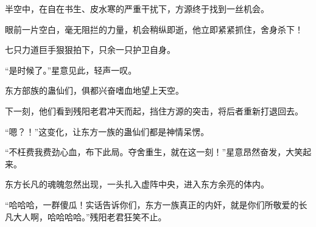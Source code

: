 \begin{this_body}
半空中，在自在书生、皮水寒的严重干扰下，方源终于找到一丝机会。

眼前一片空白，毫无阻拦的力量，机会稍纵即逝，他立即紧紧抓住，舍身杀下！

七只力道巨手狠狠拍下，只余一只护卫自身。

“是时候了。”星意见此，轻声一叹。

东方部族的蛊仙们，俱都兴奋嗜血地望上天空。

下一刻，他们看到残阳老君冲天而起，挡住方源的突击，将后者重新打退回去。

“嗯？！”这变化，让东方一族的蛊仙们都是神情呆愣。

“不枉费我费劲心血，布下此局。夺舍重生，就在这一刻！”星意昂然奋发，大笑起来。

东方长凡的魂魄忽然出现，一头扎入虚阵中央，进入东方余亮的体内。

“哈哈哈，一群傻瓜！实话告诉你们，东方一族真正的内奸，就是你们所敬爱的长凡大人啊，哈哈哈哈。”残阳老君狂笑不止。

\end{this_body}

